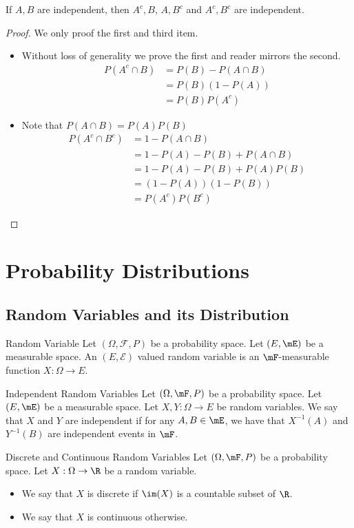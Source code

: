 \documentclass[a4paper]{article}
\begin{document}
\begin{prp}{}{} If $A,B$ are independent, then $A^c,B$, $A,B^c$ and $A^c,B^c$ are independent. 
\end{prp}
\begin{proof} We only proof the first and third item. 
\begin{itemize}
\item Without loss of generality we prove the first and reader mirrors the second. 
\begin{align*}
P(A^c\cap B)&=P(B)-P(A\cap B)\\
&=P(B)(1-P(A))\\
&=P(B)P(A^c)
\end{align*}
\item Note that $P(A\cap B)=P(A)P(B)$
\begin{align*}
P(A^c\cap B^c)&=1-P(A\cap B)\\
&=1-P(A)-P(B)+P(A\cap B)\\
&=1-P(A)-P(B)+P(A)P(B)\\
&=(1-P(A))(1-P(B))\\
&=P(A^c)P(B^c)
\end{align*}
\end{itemize}
\end{proof}

\pagebreak
\section{Probability Distributions}
\subsection{Random Variables and its Distribution}
\begin{defn}{Random Variable}{} Let $(\Omega,\mathcal{F},P)$ be a probability space. Let $(E,\mE)$ be a measurable space. An $(E,\mathcal{E})$ valued random variable is an $\mF$-measurable function $X:\Omega\to E$. 
\end{defn}

\begin{defn}{Independent Random Variables}{} Let $(\Omega,\mF,P)$ be a probability space. Let $(E,\mE)$ be a measurable space. Let $X,Y:\Omega\to E$ be random variables. We say that $X$ and $Y$ are independent if for any $A,B\in\mE$, we have that $X^{-1}(A)$ and $Y^{-1}(B)$ are independent events in $\mF$. 
\end{defn}

\begin{defn}{Discrete and Continuous Random Variables}{} Let $(\Omega,\mF,P)$ be a probability space. Let $X:\Omega\to\R$ be a random variable. 
\begin{itemize}
\item We say that $X$ is discrete if $\im(X)$ is a countable subset of $\R$. 
\item We say that $X$ is continuous otherwise. 
\end{itemize}
\end{defn}
\end{document}
